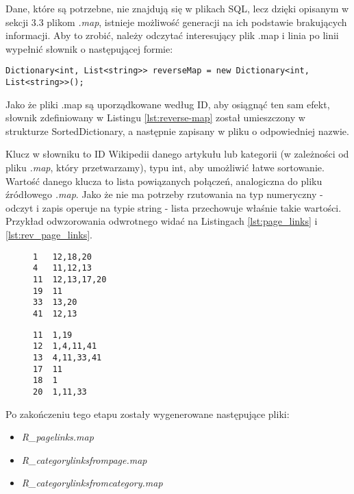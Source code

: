 Dane, które są potrzebne, nie znajdują się w plikach SQL, lecz dzięki opisanym w sekcji 3.3 plikom \textit{.map}, istnieje możliwość generacji na ich podstawie brakujących informacji. Aby to zrobić, należy odczytać interesujący plik .map i linia po linii wypełnić słownik o następującej formie:

\begin{lstlisting}[caption={Słownik przechowujący odwzorowanie odwrotne}, label=lst:reverse-map]
Dictionary<int, List<string>> reverseMap = new Dictionary<int, List<string>>();
\end{lstlisting}

Jako że pliki .map są uporządkowane według ID, aby osiągnąć ten sam efekt, słownik zdefiniowany w Listingu \ref{lst:reverse-map} został umieszczony w strukturze SortedDictionary, a następnie zapisany w pliku o odpowiedniej nazwie. 

Klucz w słowniku to ID Wikipedii danego artykułu lub kategorii (w zależności od pliku \textit{.map}, który przetwarzamy), typu int, aby umożliwić łatwe sortowanie. Wartość danego klucza to lista powiązanych połączeń, analogiczna do pliku źródłowego \textit{.map}. Jako że nie ma potrzeby rzutowania na typ numeryczny - odczyt i zapis operuje na typie string - lista przechowuje właśnie takie wartości. Przykład odwzorowania odwrotnego widać na Listingach \ref{lst:page_links} i \ref{lst:rev_page_links}.

\begin{figure}[!h]
\begin{center}
    \begin{minipage}[c]{0.45\linewidth}
        \begin{lstlisting}[frame=single,caption={Przykładowy fragment pliku pagelinks.map},label=lst:page_links]
1   12,18,20
4   11,12,13
11  12,13,17,20
19  11
33  13,20
41  12,13
\end{lstlisting}
    \end{minipage}
    \hspace{1em}
    \begin{minipage}[c]{0.45\linewidth}
        \begin{lstlisting}[frame=single,caption={Odwzorowanie odwrotne z Listingu \ref{lst:page_links} (fragment R\_pagelinks.map)},label=lst:rev_page_links]
11  1,19
12  1,4,11,41
13  4,11,33,41
17  11
18  1
20  1,11,33
\end{lstlisting}
\end{minipage}
\end{center}
\end{figure}
Po zakończeniu tego etapu zostały wygenerowane następujące pliki:
\begin{itemize}
    \item \textit{R\_pagelinks.map}
    \item \textit{R\_categorylinksfrompage.map}
    \item \textit{R\_categorylinksfromcategory.map}
\end{itemize}

